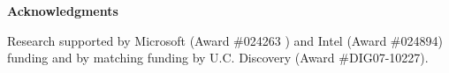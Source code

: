 \documentclass[12pt,twoside]{article}
\def\ssp{\def\baselinestretch{1.0}\large\normalsize}
\def\dsp{\def\baselinestretch{1.37}\large\normalsize}
\begin{document}
%
%
\protect\vspace{0.2in}
\begin{center}
{\textbf{Acknowledgments}}
\end{center}
Research supported by Microsoft (Award \#024263 ) and Intel (Award \#024894) funding and by matching funding by U.C. Discovery (Award \#DIG07-10227).
\newpage
\tableofcontents
\ssp
\protect\vspace{0.25in}
\normalsize
\protect\vspace{0.1in}
\nopagebreak[4]
\dsp
\newpage
\listoffigures
\newpage
\listoftables
\newpage
\pagestyle{fancyplain}
\end{document}
